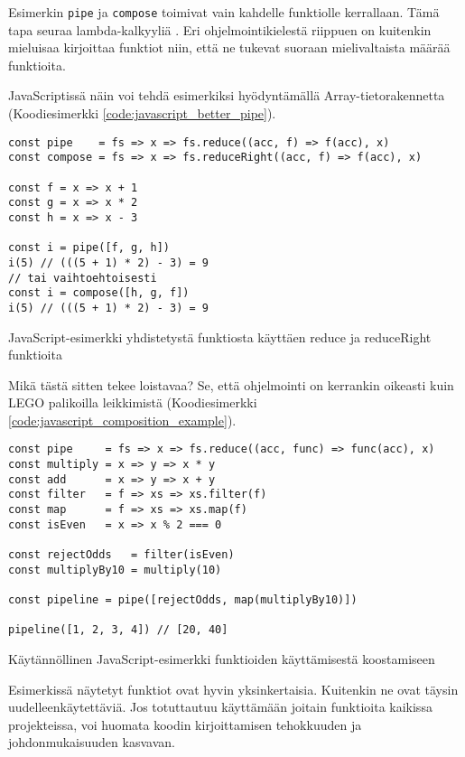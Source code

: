 Esimerkin \texttt{pipe} ja \texttt{compose} toimivat vain kahdelle funktiolle kerrallaan. Tämä tapa seuraa lambda-kalkyyliä \cite{computerphile_lambda}. Eri ohjelmointikielestä riippuen on kuitenkin mieluisaa kirjoittaa funktiot niin, että ne tukevat suoraan mielivaltaista määrää funktioita.

JavaScriptissä näin voi tehdä esimerkiksi hyödyntämällä Array-tietorakennetta (Koodiesimerkki \ref{code:javascript_better_pipe}).

\begin{code}
    \begin{verbatim}
const pipe    = fs => x => fs.reduce((acc, f) => f(acc), x)
const compose = fs => x => fs.reduceRight((acc, f) => f(acc), x)

const f = x => x + 1
const g = x => x * 2
const h = x => x - 3

const i = pipe([f, g, h])
i(5) // (((5 + 1) * 2) - 3) = 9
// tai vaihtoehtoisesti 
const i = compose([h, g, f])
i(5) // (((5 + 1) * 2) - 3) = 9

\end{verbatim}
    \caption{JavaScript-esimerkki yhdistetystä funktiosta käyttäen reduce ja reduceRight funktioita}
    \label{code:javascript_better_pipe}
\end{code}

Mikä tästä sitten tekee loistavaa? Se, että ohjelmointi on kerrankin oikeasti kuin LEGO palikoilla leikkimistä (Koodiesimerkki \ref{code:javascript_composition_example}).

\begin{code}
    \begin{verbatim}
const pipe     = fs => x => fs.reduce((acc, func) => func(acc), x)
const multiply = x => y => x * y
const add      = x => y => x + y
const filter   = f => xs => xs.filter(f)
const map      = f => xs => xs.map(f)
const isEven   = x => x % 2 === 0

const rejectOdds   = filter(isEven)
const multiplyBy10 = multiply(10)

const pipeline = pipe([rejectOdds, map(multiplyBy10)])

pipeline([1, 2, 3, 4]) // [20, 40]

\end{verbatim}
    \caption{Käytännöllinen JavaScript-esimerkki funktioiden käyttämisestä koostamiseen}
    \label{code:javascript_composition_example}
\end{code}

Esimerkissä näytetyt funktiot ovat hyvin yksinkertaisia. Kuitenkin ne ovat täysin uudelleenkäytettäviä. Jos totuttautuu käyttämään joitain funktioita kaikissa projekteissa, voi huomata koodin kirjoittamisen tehokkuuden ja johdonmukaisuuden kasvavan.

